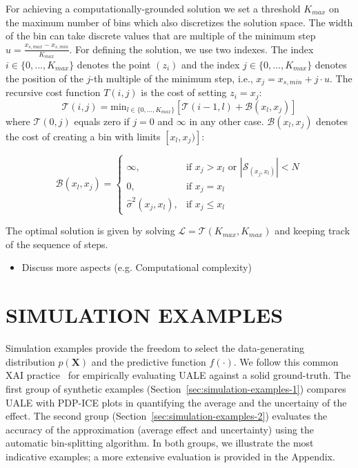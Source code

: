 \documentclass[twoside]{article}
\begin{document}
For achieving a computationally-grounded solution we set a threshold
\(K_{max}\) on the maximum number of bins which also discretizes the
solution space. The width of the bin can take discrete values that are
multiple of the minimum step
\(u = \frac{x_{s, max} - x_{s, min}}{K_{max}}\). For defining the
solution, we use two indexes. The index
\(i \in \{0, \ldots, K_{max}\}\) denotes the point \((z_i)\) and the
index \(j \in \{0, \ldots, K_{max}\} \) denotes the position of the
\(j\)-th multiple of the minimum step, i.e., 
\(x_j = x_{s,min} + j \cdot u\). The recursive cost function
\(T(i,j)\) is the cost of setting \(z_i=x_j\):
\begin{equation}
  \label{eq:recursive_cost}
  \mathcal{T}(i,j) = \mathrm{min}_{l \in \{0, \ldots, K_{max}\}} \left [ \mathcal{T}(i-1, l) + \mathcal{B}(x_l, x_j) \right ]
\end{equation}
%
where \(\mathcal{T}(0,j)\) equals zero if \(j=0\) and \(\infty\) in
any other case. \(\mathcal{B}(x_l, x_j)\) denotes the cost of creating a bin
with limits \([x_l, x_j)]\):

\begin{equation}
  \label{eq:cost_step}
  \mathcal{B}(x_l, x_j) = \begin{cases}
                            \infty, & \text{if $x_j > x_l$ or \(|\mathcal{S}_{(x_j, x_l)}| < N\)}\\
                            0, & \text{if $x_j = x_l$}\\
                            \hat{\sigma}^2(x_j, x_l), &\text{if $x_j \leq x_l$}
  \end{cases}
\end{equation}

The optimal solution is given by solving
\(\mathcal{L} = \mathcal{T}(K_{max}, K_{max})\) and keeping track of the sequence of
steps. 

\noindent

\begin{itemize}
\item Discuss more aspects (e.g. Computational complexity)
\end{itemize}

\section{SIMULATION EXAMPLES}
\label{sec:simulation-examples}

Simulation examples provide the freedom to select the data-generating
distribution \(p(\mathbf{X})\) and the predictive function
\(f(\cdot)\). We follow this common XAI
practice~\citep{aas2021explaining, herbinger2022repid} for empirically
evaluating UALE against a solid ground-truth. The first group of
synthetic examples (Section~\ref{sec:simulation-examples-1}) compares
UALE with PDP-ICE plots in quantifying the average and the uncertainy
of the effect. The second group
(Section~\ref{sec:simulation-examples-2}) evaluates the accuracy of
the approximation (average effect and uncertainty) using the automatic
bin-splitting algorithm. In both groups, we illustrate the most
indicative examples; a more extensive evaluation is provided in the
Appendix.
\end{document}
